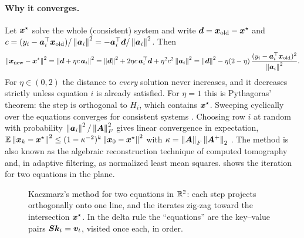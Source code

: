 \paragraph{Why it converges.} Let $\bm{x}^\star$ solve the whole (consistent) system and write
$\bm{d} = \bm{x}_{\mathrm{old}} - \bm{x}^\star$ and $c = (y_i - \bm{a}_i^{\top}\bm{x}_{\mathrm{old}})/\left\lVert \bm{a}_i\right\rVert^2
= -\bm{a}_i^{\top}\bm{d}/\left\lVert \bm{a}_i\right\rVert^2$. Then
\begin{equation}\label{eq:c05-kaczmarz-pyth}
  \left\lVert \bm{x}_{\mathrm{new}} - \bm{x}^\star\right\rVert^2 = \left\lVert \bm{d} + \eta c\,\bm{a}_i\right\rVert^2
  = \left\lVert \bm{d}\right\rVert^2 + 2\eta c\,\bm{a}_i^{\top}\bm{d} + \eta^2c^2\left\lVert \bm{a}_i\right\rVert^2
  = \left\lVert \bm{d}\right\rVert^2 - \eta(2-\eta)\,\frac{(y_i - \bm{a}_i^{\top}\bm{x}_{\mathrm{old}})^2}{\left\lVert \bm{a}_i\right\rVert^2}.
\end{equation}
For $\eta \in (0,2)$ the distance to \emph{every} solution never increases, and it decreases
strictly unless equation $i$ is already satisfied. For $\eta = 1$ this is Pythagoras' theorem: the
step is orthogonal to $H_i$, which contains $\bm{x}^\star$. Sweeping cyclically over the equations
converges for consistent systems \citep{c05-kaczmarz1937}. Choosing row $i$ at random with
probability $\left\lVert \bm{a}_i\right\rVert^2/\left\lVert \bm{A}\right\rVert_F^2$ gives linear convergence in expectation,
$\mathbb{E}\left\lVert \bm{x}_k - \bm{x}^\star\right\rVert^2 \le (1 - \kappa^{-2})^k\left\lVert \bm{x}_0 - \bm{x}^\star\right\rVert^2$ with
$\kappa = \left\lVert \bm{A}\right\rVert_F\left\lVert \bm{A}^{+}\right\rVert_2$ \citep{c05-strohmer2009randomized}. The method is also
known as the algebraic reconstruction technique of computed tomography
\citep{c05-gordon1970art} and, in adaptive filtering, as normalized least mean squares.
 shows the iteration for two equations in the plane.

\begin{figure}[t]
\centering
{}
\caption{Kaczmarz's method for two equations in $\mathbb{R}^2$: each step projects orthogonally onto one
line, and the iterates zig-zag toward the intersection $\bm{x}^\star$. In the delta rule the
``equations'' are the key--value pairs $\bm{S}\bm{k}_t = \bm{v}_t$, visited once each, in order.}
\label{fig:c05-kaczmarz}
\end{figure}

